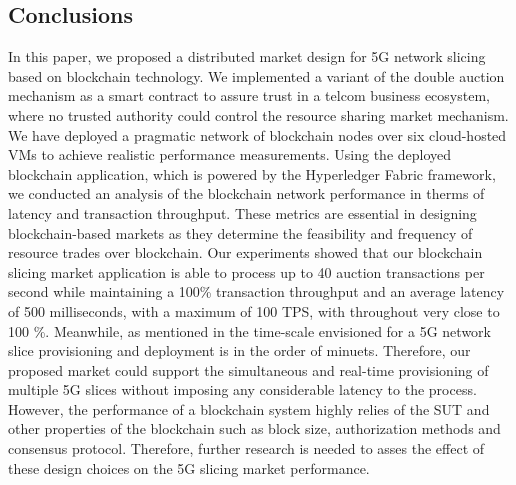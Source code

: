 \subsection{Conclusions}
\label{sec:Conclusions}
In this paper, we proposed a distributed market design for 5G network slicing based on blockchain technology. We implemented a variant of the double auction mechanism as a smart contract to assure trust in a telcom business ecosystem, where no trusted authority could control the resource sharing market mechanism. We have deployed a pragmatic network of blockchain nodes over six cloud-hosted \acp{VM} to achieve realistic performance measurements. Using the deployed blockchain application, which is powered by the Hyperledger Fabric framework, we conducted an analysis of the blockchain network performance in therms of latency and transaction throughput. These metrics are essential in designing blockchain-based markets as they determine the feasibility and frequency of resource trades over blockchain. Our experiments showed that our blockchain slicing market application is able to process up to 40 auction transactions per second while maintaining a 100\% transaction throughput and an average latency of 500 milliseconds, with a maximum of 100 TPS, with throughout very close to 100 \%.
Meanwhile, as mentioned in \cite{valcarenghireliable} the time-scale envisioned for a 5G network slice provisioning and deployment is in the order of minuets. Therefore, our proposed market could support the simultaneous and real-time provisioning of multiple 5G slices without imposing any considerable latency to the process. However, the performance of a blockchain system highly relies of the \ac{SUT} and other properties of the blockchain such as block size, authorization methods and consensus protocol. Therefore, further research is needed to asses the effect of these design choices on the 5G slicing market performance.



